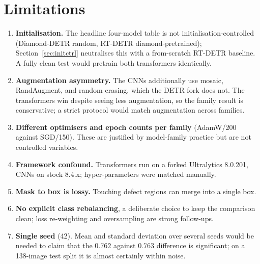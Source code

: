 \documentclass[11pt,a4paper]{article}
\begin{document}
\section{Limitations}\label{sec:limits}
\begin{enumerate}[leftmargin=1.5em,itemsep=2pt,topsep=2pt]
  \item \textbf{Initialisation.} The headline four-model table is not initialisation-controlled
        (Diamond-DETR random, RT-DETR diamond-pretrained); Section~\ref{sec:initctrl} neutralises
        this with a from-scratch RT-DETR baseline. A fully clean test would pretrain both
        transformers identically.
  \item \textbf{Augmentation asymmetry.} The CNNs additionally use mosaic, RandAugment, and random
        erasing, which the DETR fork does not. The transformers win despite seeing less
        augmentation, so the family result is conservative; a strict protocol would match
        augmentation across families.
  \item \textbf{Different optimisers and epoch counts per family} (AdamW/200 against SGD/150). These
        are justified by model-family practice but are not controlled variables.
  \item \textbf{Framework confound.} Transformers run on a forked Ultralytics 8.0.201, CNNs on stock
        8.4.x; hyper-parameters were matched manually.
  \item \textbf{Mask to box is lossy.} Touching defect regions can merge into a single box.
  \item \textbf{No explicit class rebalancing}, a deliberate choice to keep the comparison clean;
        loss re-weighting and oversampling are strong follow-ups.
  \item \textbf{Single seed} (42). Mean and standard deviation over several seeds would be needed to
        claim that the $0.762$ against $0.763$ difference is significant; on a 138-image test split
        it is almost certainly within noise.
\end{enumerate}

\end{document}
